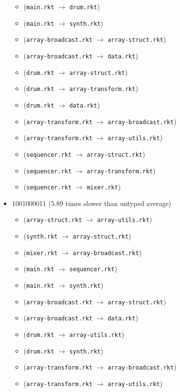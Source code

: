 \documentclass{article}
\newcommand{\mono}[1]{\texttt{#1}}
\begin{document}
\begin{itemize}
\begin{itemize}
  \item (\mono{main.rkt} $\rightarrow$ \mono{drum.rkt})
  \item (\mono{main.rkt} $\rightarrow$ \mono{synth.rkt})
  \item (\mono{array-broadcast.rkt} $\rightarrow$ \mono{array-struct.rkt})
  \item (\mono{array-broadcast.rkt} $\rightarrow$ \mono{data.rkt})
  \item (\mono{drum.rkt} $\rightarrow$ \mono{array-struct.rkt})
  \item (\mono{drum.rkt} $\rightarrow$ \mono{array-transform.rkt})
  \item (\mono{drum.rkt} $\rightarrow$ \mono{data.rkt})
  \item (\mono{array-transform.rkt} $\rightarrow$ \mono{array-broadcast.rkt})
  \item (\mono{array-transform.rkt} $\rightarrow$ \mono{array-utils.rkt})
  \item (\mono{sequencer.rkt} $\rightarrow$ \mono{array-struct.rkt})
  \item (\mono{sequencer.rkt} $\rightarrow$ \mono{array-transform.rkt})
  \item (\mono{sequencer.rkt} $\rightarrow$ \mono{mixer.rkt})
  \end{itemize}
\item 1001000011 (5.89 times slower than untyped average)
  \begin{itemize}
  \item (\mono{array-struct.rkt} $\rightarrow$ \mono{array-utils.rkt})
  \item (\mono{synth.rkt} $\rightarrow$ \mono{array-struct.rkt})
  \item (\mono{mixer.rkt} $\rightarrow$ \mono{array-broadcast.rkt})
  \item (\mono{main.rkt} $\rightarrow$ \mono{sequencer.rkt})
  \item (\mono{main.rkt} $\rightarrow$ \mono{synth.rkt})
  \item (\mono{array-broadcast.rkt} $\rightarrow$ \mono{array-struct.rkt})
  \item (\mono{array-broadcast.rkt} $\rightarrow$ \mono{data.rkt})
  \item (\mono{drum.rkt} $\rightarrow$ \mono{array-utils.rkt})
  \item (\mono{drum.rkt} $\rightarrow$ \mono{synth.rkt})
  \item (\mono{array-transform.rkt} $\rightarrow$ \mono{array-broadcast.rkt})
  \item (\mono{array-transform.rkt} $\rightarrow$ \mono{array-utils.rkt})

\end{itemize}
\end{itemize}
\end{document}
